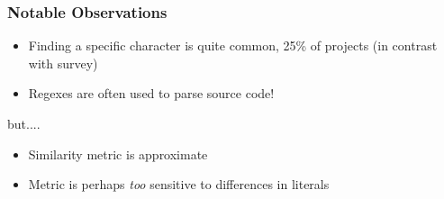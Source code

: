 \begin{frame}
\frametitle{Notable Observations}

\begin{block}{}
\begin{itemize}
	\item Finding a specific character is quite common, 25\% of projects (in contrast with survey)
	\item Regexes are often used to parse source code!
\end{itemize}
\end{block}

but....

\begin{block}{}
\begin{itemize}
	\item Similarity metric is approximate
	\item Metric is perhaps \emph{too} sensitive to differences in literals
\end{itemize}
\end{block}

%


\end{frame}

